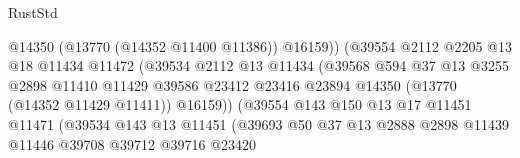 \begin{lexlean}{RustStd}
\begin{coremodule}
                                          @14350
                                          (@13770 (@14352 @11400 @11386))
                                          @16159))
                                      (@39554
                                        @2112
                                        @2205
                                        @13
                                        @18
                                        @11434
                                        @11472
                                        (@39534
                                          @2112
                                          @13
                                          @11434
                                          (@39568
                                            @594
                                            @37
                                            @13
                                            @3255
                                            @2898
                                            @11410
                                            @11429
                                            @39586
                                            @23412
                                            @23416
                                            @23894
                                            @14350
                                            (@13770 (@14352 @11429 @11411))
                                            @16159))
                                        (@39554
                                          @143
                                          @150
                                          @13
                                          @17
                                          @11451
                                          @11471
                                          (@39534
                                            @143
                                            @13
                                            @11451
                                            (@39693
                                              @50
                                              @37
                                              @13
                                              @2888
                                              @2898
                                              @11439
                                              @11446
                                              @39708
                                              @39712
                                              @39716
                                              @23420

\end{coremodule}
\end{lexlean}
